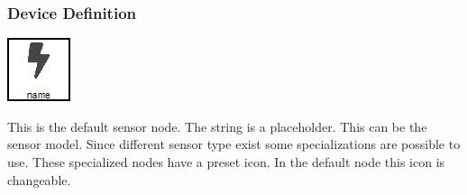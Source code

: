 \subsubsection{Device Definition}
\noindent\begin{minipage}{0.15\textwidth}%
	\includegraphics[width=\linewidth]{assets/images/sensor7}
\end{minipage}%
\hfill%
\begin{minipage}{0.8\textwidth}
	This is the default sensor node. The string  is a placeholder. This can be the sensor model. Since different sensor type exist some specializations are possible to use. These specialized nodes have a preset icon. In the default node this icon is changeable.
\end{minipage}

